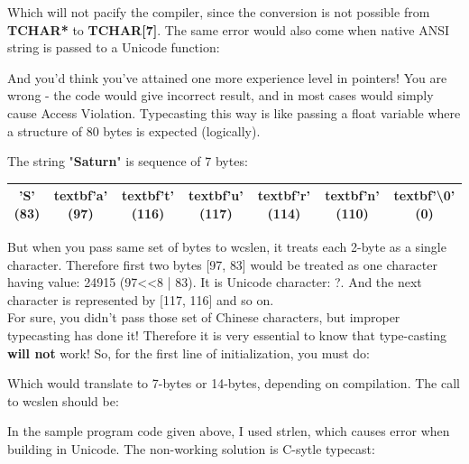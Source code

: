 	Which will not pacify the compiler, since the conversion is not possible from \textbf{TCHAR*} to \textbf{TCHAR[7]}. The same error would also come when native ANSI string is passed to a Unicode function:\\
	
	
	And you'd think you've attained one more experience level in pointers! You are wrong - the code would give incorrect result, and in most cases would simply cause Access Violation. Typecasting this way is like passing a float variable where a structure of 80 bytes is expected (logically).
	
	The string "\textbf{Saturn}" is sequence of 7 bytes:
	
	\begin{tabular}{|c|c|c|c|c|c|c|}
		\hline  \textbf{'S'} (83) & textbf{'a'} (97) & textbf{'t'} (116) & textbf{'u'} (117) & textbf{'r'} (114) & textbf{'n'} (110) & textbf{'\textbackslash 0'} (0) \\ 
		\hline 
	\end{tabular} 
	
	But when you pass same set of bytes to wcslen, it treats each 2-byte as a single character. Therefore first two bytes [97, 83] would be treated as one character having value: 24915 (97<<8 | 83). It is Unicode character: ?. And the next character is represented by [117, 116] and so on.\\
	
	For sure, you didn't pass those set of Chinese characters, but improper typecasting has done it! Therefore it is very essential to know that type-casting \textbf{will not} work! So, for the first line of initialization, you must do:\\
	
	
	Which would translate to 7-bytes or 14-bytes, depending on compilation. The call to wcslen should be:\\
	
	
	In the sample program code given above, I used strlen, which causes error when building in Unicode. The non-working solution is C-sytle typecast:\\
	
